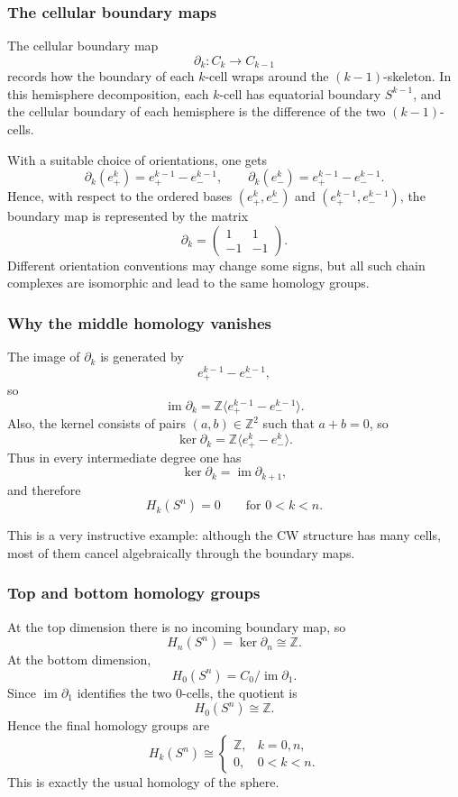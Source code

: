 \documentclass[12pt,a4paper]{article}
\theoremstyle{notespace}
\begin{document}
\subsubsection{The cellular boundary maps}

The cellular boundary map
\[
\partial_k:C_k\to C_{k-1}
\]
records how the boundary of each \(k\)-cell wraps around the \((k-1)\)-skeleton. In this hemisphere decomposition, each \(k\)-cell has equatorial boundary \(S^{k-1}\), and the cellular boundary of each hemisphere is the difference of the two \((k-1)\)-cells.

With a suitable choice of orientations, one gets
\[
\partial_k(e_+^k)=e_+^{k-1}-e_-^{k-1},
\qquad
\partial_k(e_-^k)=e_+^{k-1}-e_-^{k-1}.
\]
Hence, with respect to the ordered bases \((e_+^k,e_-^k)\) and \((e_+^{k-1},e_-^{k-1})\), the boundary map is represented by the matrix
\[
\partial_k=
\begin{pmatrix}
	1 & 1\\
	-1 & -1
\end{pmatrix}.
\]
Different orientation conventions may change some signs, but all such chain complexes are isomorphic and lead to the same homology groups.

\subsubsection{Why the middle homology vanishes}

The image of \(\partial_k\) is generated by
\[
e_+^{k-1}-e_-^{k-1},
\]
so
\[
\operatorname{im}\partial_k
=
\mathbb Z\langle e_+^{k-1}-e_-^{k-1}\rangle.
\]
Also, the kernel consists of pairs \((a,b)\in \mathbb Z^2\) such that \(a+b=0\), so
\[
\ker\partial_k
=
\mathbb Z\langle e_+^k-e_-^k\rangle.
\]
Thus in every intermediate degree one has
\[
\ker\partial_k=\operatorname{im}\partial_{k+1},
\]
and therefore
\[
H_k(S^n)=0
\qquad\text{for }0<k<n.
\]

This is a very instructive example: although the CW structure has many cells, most of them cancel algebraically through the boundary maps.

\subsubsection{Top and bottom homology groups}

At the top dimension there is no incoming boundary map, so
\[
H_n(S^n)=\ker\partial_n\cong \mathbb Z.
\]
At the bottom dimension,
\[
H_0(S^n)=C_0/\operatorname{im}\partial_1.
\]
Since \(\operatorname{im}\partial_1\) identifies the two \(0\)-cells, the quotient is
\[
H_0(S^n)\cong \mathbb Z.
\]
Hence the final homology groups are
\[
H_k(S^n)\cong
\begin{cases}
	\mathbb Z,& k=0,n,\\[4pt]
	0,& 0<k<n.
\end{cases}
\]
This is exactly the usual homology of the sphere.
\end{document}
